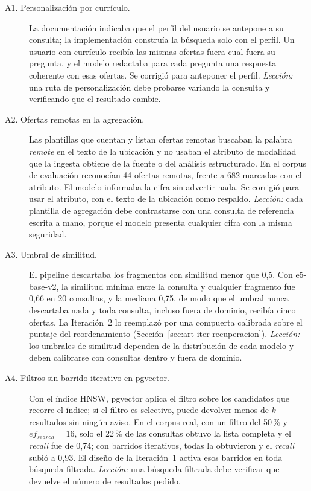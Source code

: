\begin{description}
    \item[A1. Personalización por currículo.] La documentación indicaba que el perfil del usuario se antepone a su consulta; la implementación construía la búsqueda solo con el perfil. Un usuario con currículo recibía las mismas ofertas fuera cual fuera su pregunta, y el modelo redactaba para cada pregunta una respuesta coherente con esas ofertas. Se corrigió para anteponer el perfil. \emph{Lección:} una ruta de personalización debe probarse variando la consulta y verificando que el resultado cambie.
    \item[A2. Ofertas remotas en la agregación.] Las plantillas que cuentan y listan ofertas remotas buscaban la palabra \textit{remote} en el texto de la ubicación y no usaban el atributo de modalidad que la ingesta obtiene de la fuente o del análisis estructurado. En el corpus de evaluación reconocían 44 ofertas remotas, frente a 682 marcadas con el atributo. El modelo informaba la cifra sin advertir nada. Se corrigió para usar el atributo, con el texto de la ubicación como respaldo. \emph{Lección:} cada plantilla de agregación debe contrastarse con una consulta de referencia escrita a mano, porque el modelo presenta cualquier cifra con la misma seguridad.
    \item[A3. Umbral de similitud.] El pipeline descartaba los fragmentos con similitud menor que 0,5. Con e5-base-v2, la similitud mínima entre la consulta y cualquier fragmento fue 0,66 en 20 consultas, y la mediana 0,75, de modo que el umbral nunca descartaba nada y toda consulta, incluso fuera de dominio, recibía cinco ofertas. La Iteración~2 lo reemplazó por una compuerta calibrada sobre el puntaje del reordenamiento (Sección~\ref{sec:art-iter-recuperacion}). \emph{Lección:} los umbrales de similitud dependen de la distribución de cada modelo y deben calibrarse con consultas dentro y fuera de dominio.
    \item[A4. Filtros sin barrido iterativo en pgvector.] Con el índice HNSW, pgvector aplica el filtro sobre los candidatos que recorre el índice; si el filtro es selectivo, puede devolver menos de $k$ resultados sin ningún aviso. En el corpus real, con un filtro del 50\,\% y $ef_{search}=16$, solo el 22\,\% de las consultas obtuvo la lista completa y el \textit{recall} fue de 0,74; con barridos iterativos, todas la obtuvieron y el \textit{recall} subió a 0,93. El diseño de la Iteración~1 activa esos barridos en toda búsqueda filtrada. \emph{Lección:} una búsqueda filtrada debe verificar que devuelve el número de resultados pedido.

\end{description}
